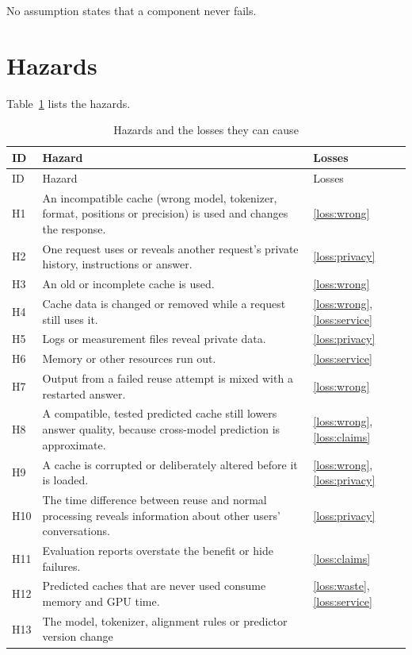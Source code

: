 \documentclass{article}
\begin{document}
No assumption states that a component never fails.

\section{Hazards}
\label{sec:hazards}

Table~\ref{tab:hazards} lists the hazards.

\begin{longtable}{@{}p{}p{}p{}@{}}
\caption{Hazards and the losses they can cause}\label{tab:hazards}\\
\toprule ID & Hazard & Losses\\\midrule\endfirsthead
\toprule ID & Hazard & Losses\\\midrule\endhead
H1 & An incompatible cache (wrong model, tokenizer, format, positions or
precision) is used and changes the response. & \ref{loss:wrong}\\
H2 & One request uses or reveals another request's private history,
instructions or answer. & \ref{loss:privacy}\\
H3 & An old or incomplete cache is used. & \ref{loss:wrong}\\
H4 & Cache data is changed or removed while a request still uses it. &
\ref{loss:wrong}, \ref{loss:service}\\
H5 & Logs or measurement files reveal private data. &
\ref{loss:privacy}\\
H6 & Memory or other resources run out. & \ref{loss:service}\\
H7 & Output from a failed reuse attempt is mixed with a restarted answer. &
\ref{loss:wrong}\\
H8 & A compatible, tested predicted cache still lowers answer quality,
because cross-model prediction is approximate. & \ref{loss:wrong},
\ref{loss:claims}\\
H9 & A cache is corrupted or deliberately altered before it is loaded. &
\ref{loss:wrong}, \ref{loss:privacy}\\
H10 & The time difference between reuse and normal processing reveals
information about other users' conversations. & \ref{loss:privacy}\\
H11 & Evaluation reports overstate the benefit or hide failures. &
\ref{loss:claims}\\
H12 & Predicted caches that are never used consume memory and GPU time. &
\ref{loss:waste}, \ref{loss:service}\\
H13 & The model, tokenizer, alignment rules or predictor version change

\end{longtable}
\end{document}
